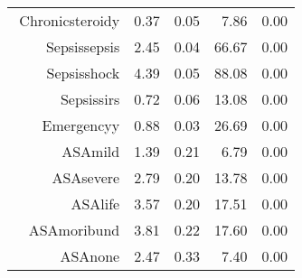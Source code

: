 \begin{tabular}{rrrrr}
$$  Chronic\-steroid\-y & 0.37 & 0.05 & 7.86 & 0.00 \\ 
  Sepsis\-sepsis & 2.45 & 0.04 & 66.67 & 0.00 \\ 
  Sepsis\-shock & 4.39 & 0.05 & 88.08 & 0.00 \\ 
  Sepsis\-sirs & 0.72 & 0.06 & 13.08 & 0.00 \\ 
  Emergency\-y & 0.88 & 0.03 & 26.69 & 0.00 \\ 
  ASA\-mild & 1.39 & 0.21 & 6.79 & 0.00 \\ 
  ASA\-severe & 2.79 & 0.20 & 13.78 & 0.00 \\ 
  ASA\-life & 3.57 & 0.20 & 17.51 & 0.00 \\ 
  ASA\-moribund & 3.81 & 0.22 & 17.60 & 0.00 \\ 
  ASA\-none & 2.47 & 0.33 & 7.40 & 0.00 \\ 
   \hline
\end{tabular}

